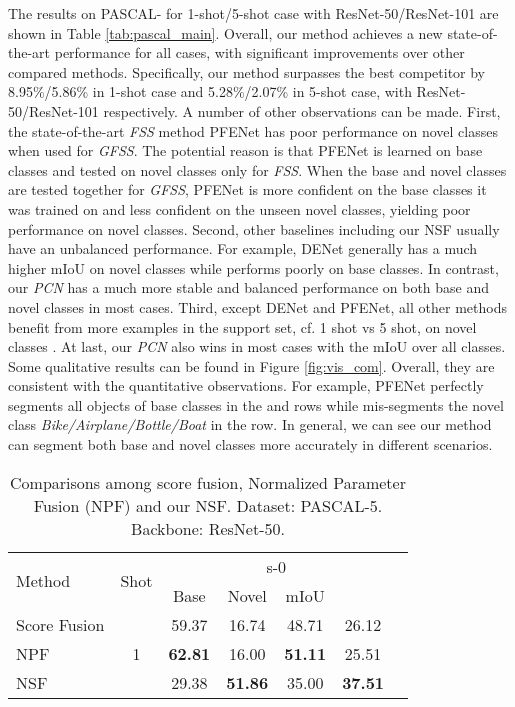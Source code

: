 \documentclass[journal]{IEEEtran}
\begin{document}
The results on PASCAL- for 1-shot/5-shot case with ResNet-50/ResNet-101 are shown in Table \ref{tab:pascal_main}.
Overall, our method achieves a new state-of-the-art performance for all cases, with significant improvements over other compared methods.
Specifically, our method surpasses the best competitor by 8.95\%/5.86\% in 1-shot case and 5.28\%/2.07\% in 5-shot case, with ResNet-50/ResNet-101 respectively.
A number of other observations can be made.
First, the state-of-the-art \textit{FSS} method PFENet \cite{tian2020prior} has poor performance on novel classes when used for \textit{GFSS}.
The potential reason is that PFENet is learned on base classes and tested on novel classes only for \textit{FSS}. 
When the base and novel classes are tested together for \textit{GFSS}, PFENet is more confident on the base classes it was trained on and less confident on the unseen novel classes, yielding poor performance on novel classes. 
Second, other baselines including our NSF usually have an unbalanced performance. 
For example, DENet \cite{liu2020dynamic} generally has a much higher mIoU on novel classes while performs poorly on base classes. 
In contrast, our \textit{PCN} has a much more stable and balanced performance on both base and novel classes in most cases.
Third, except DENet and PFENet, all other methods benefit from more examples in the support set, cf. 1 shot vs 5 shot, on novel classes .
At last, our \textit{PCN} also wins in most cases with the mIoU over all classes.
Some qualitative results can be found in Figure \ref{fig:vis_com}. Overall, they are consistent with the quantitative observations.
For example, PFENet perfectly segments all objects of base classes in the  and  rows while mis-segments the novel class \textit{Bike/Airplane/Bottle/Boat} in the  row.
In general, we can see our method can segment both base and novel classes more accurately in different scenarios.

\begin{table}[ht]
    \centering
    \caption{Comparisons among score fusion, Normalized Parameter Fusion (NPF) and our NSF. Dataset: PASCAL-5. Backbone: ResNet-50.}
\begin{tabular}{l|c|ccccc}
    \hline
         \multirow{2}{*}{Method} & \multirow{2}{*}{Shot} & \multicolumn{4}{c}{s-0} \\
         \cline{3-6}
          & & Base & Novel & mIoU &  \\
         \hline
         Score Fusion &\multirow{3}{*}{1}  & 59.37 & 16.74 & 48.71 & 26.12 \\
NPF & & \textbf{62.81} & 16.00 & \textbf{51.11} & 25.51 \\
         NSF & & 29.38 & \textbf{51.86} & 35.00 & \textbf{37.51} \\
    \hline
    \end{tabular}
\label{tab:score_fusion}
\end{table}
\end{document}
